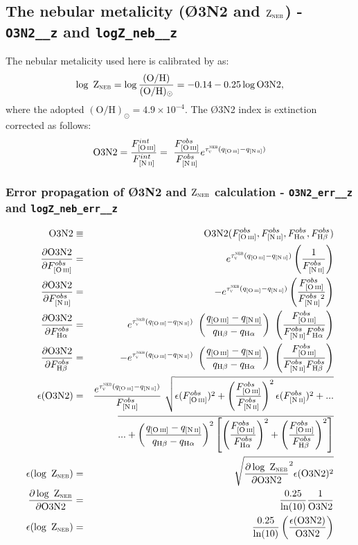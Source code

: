 \documentclass[a4paper,11pt]{article}
\begin{document}
\subsection{The nebular metalicity (\O3N2 and $\textrm{Z}_{\textsc{neb}}$) - \texttt{O3N2\_\_z} and \texttt{logZ\_neb\_\_z}}

The nebular metalicity used here is calibrated by \citep{Stasinska.2006a} as:
\begin{equation}
	\logZN = \log \frac{(\textrm{O}/\textrm{H})}{(\textrm{O}/\textrm{H})_\odot} = - 0.14 - 0.25 \log \O3N2,
\end{equation}
\noindent where the adopted $(\textrm{O}/\textrm{H})_\odot = 4.9 \times 10^{-4}$. The \O3N2 index is extinction corrected as follows:
\begin{equation}
	\O3N2 = \frac{F_{\oIII}^{int}}{F_{\nII}^{int}} = \
\frac{F_{\oIII}^{obs}}{F_{\nII}^{obs}} e^{\tauVN (q_{\oIII} - q_{\nII})} \\
\end{equation}

\subsubsection{Error propagation of \O3N2 and $\textrm{Z}_{\textsc{neb}}$ calculation - \texttt{O3N2\_err\_\_z} and \texttt{logZ\_neb\_err\_\_z}}

\begin{eqnarray}
	\O3N2 &\equiv& \O3N2(F_{\oIII}^{obs}, F_{\nII}^{obs}, F_{\Halpha}^{obs}, F_{\Hbeta}^{obs}) \\
	\del{\O3N2}{F_{\oIII}^{obs}} &=& e^{\tauVN (q_{\oIII} - q_{\nII})}\left(\frac{1}{F_{\nII}^{obs}}\right) \\
	\del{\O3N2}{F_{\nII}^{obs}} &=& - e^{\tauVN (q_{\oIII} - q_{\nII})}\left(\frac{F_{\oIII}^{obs}}{F_{\nII}^{obs}{}^2}\right) \\
	\del{\O3N2}{F_{\Halpha}^{obs}} &=& e^{\tauVN (q_{\oIII} - q_{\nII})} \
\left(\frac{q_{\oIII} - q_{\nII}}{q_{\Hbeta} - q_{\Halpha}}\right) \
\left(\frac{F_{\oIII}^{obs}}{F_{\nII}^{obs} F_{\Halpha}^{obs}}\right) \\
	\del{\O3N2}{F_{\Hbeta}^{obs}} &=& - e^{\tauVN (q_{\oIII} - q_{\nII})} \
\left(\frac{q_{\oIII} - q_{\nII}}{q_{\Hbeta} - q_{\Halpha}}\right) \
\left(\frac{F_{\oIII}^{obs}}{F_{\nII}^{obs} F_{\Hbeta}^{obs}}\right) \\
	\nonumber \epsilon(\O3N2) &=& \frac{e^{\tauVN (q_{\oIII} - q_{\nII})}}{F_{\nII}^{obs}} \
\sqrt{ \epsilon(F_{\oIII}^{obs})^2 + \left(\frac{F_{\oIII}^{obs}}{F_{\nII}^{obs}}\right)^2 \epsilon(F_{\nII}^{obs})^2 + ... } \\
	&& \overline{... + \left(\frac{q_{\oIII} - q_{\nII}}{q_{\Hbeta} - q_{\Halpha}}\right)^2 \left[\left(\frac{F_{\oIII}^{obs}}{F_{\Halpha}^{obs}}\right)^2 + \left(\frac{F_{\oIII}^{obs}}{F_{\Hbeta}^{obs}}\right)^2 \right]} \\
	\epsilon(\logZN) &=& \sqrt{\del{\logZN}{\O3N2}^2 \epsilon(\O3N2)^2} \\
	\del{\logZN}{\O3N2} &=& \frac{0.25}{\ln(10)} \frac{1}{\O3N2} \\
	\epsilon(\logZN) &=& \frac{0.25}{\ln(10)} \left(\frac{\epsilon(\O3N2)}{\O3N2}\right)
\end{eqnarray}
\\
\end{document}
